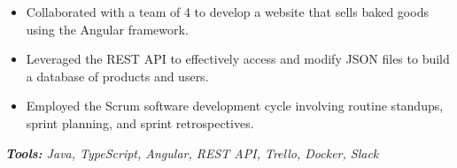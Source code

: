 \documentclass[10pt,letter]{altacv}
\begin{document}
\begin{itemize}
  \item Collaborated with a team of 4 to develop a website that sells baked goods using the Angular framework.
  \item Leveraged the REST API to effectively access and modify JSON files to build a database of products and users.
  \item Employed the Scrum software development cycle involving routine standups, sprint planning, and sprint retrospectives.
\end{itemize}
\textit{\textbf{Tools:} Java, TypeScript, Angular, REST API, Trello, Docker, Slack}




\clearpage
\end{document}
